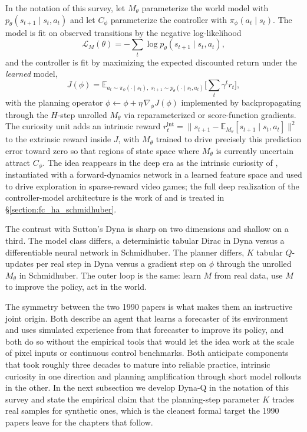 In the notation of this survey, let $M_\theta$ parameterize the world model with $p_\theta(s_{t+1} \mid s_t, a_t)$ and let $C_\phi$ parameterize the controller with $\pi_\phi(a_t \mid s_t)$. The model is fit on observed transitions by the negative log-likelihood
\[
  \mathcal{L}_M(\theta) = -\sum_t \log p_\theta(s_{t+1} \mid s_t, a_t),
\]
and the controller is fit by maximizing the expected discounted return under the \emph{learned} model,
\[
  J(\phi) = \mathbb{E}_{a_t \sim \pi_\phi(\cdot \mid s_t),\; s_{t+1} \sim p_\theta(\cdot \mid s_t, a_t)} \Big[ \sum_t \gamma^t r_t \Big],
\]
with the planning operator $\phi \leftarrow \phi + \eta \, \nabla_\phi J(\phi)$ implemented by backpropagating through the $H$-step unrolled $M_\theta$ via reparameterized or score-function gradients. The curiosity unit adds an intrinsic reward $r_t^{\text{int}} = \| s_{t+1} - \mathbb{E}_{M_\theta}[s_{t+1} \mid s_t, a_t] \|^2$ to the extrinsic reward inside $J$, with $M_\theta$ trained to drive precisely this prediction error toward zero so that regions of state space where $M_\theta$ is currently uncertain attract $C_\phi$. The idea reappears in the deep era as the intrinsic curiosity of \citet{Pathak2017}, instantiated with a forward-dynamics network in a learned feature space and used to drive exploration in sparse-reward video games; the full deep realization of the controller-model architecture is the work of \citet{HaSchmidhuber2018} and is treated in \S\ref{section:fc_ha_schmidhuber}.

The contrast with Sutton's Dyna is sharp on two dimensions and shallow on a third. The model class differs, a deterministic tabular Dirac in Dyna versus a differentiable neural network in Schmidhuber. The planner differs, $K$ tabular $Q$-updates per real step in Dyna versus a gradient step on $\phi$ through the unrolled $M_\theta$ in Schmidhuber. The outer loop is the same: learn $M$ from real data, use $M$ to improve the policy, act in the world.

The symmetry between the two 1990 papers is what makes them an instructive joint origin. Both describe an agent that learns a forecaster of its environment and uses simulated experience from that forecaster to improve its policy, and both do so without the empirical tools that would let the idea work at the scale of pixel inputs or continuous control benchmarks. Both anticipate components that took roughly three decades to mature into reliable practice, intrinsic curiosity in one direction and planning amplification through short model rollouts in the other. In the next subsection we develop Dyna-Q in the notation of this survey and state the empirical claim that the planning-step parameter $K$ trades real samples for synthetic ones, which is the cleanest formal target the 1990 papers leave for the chapters that follow.
